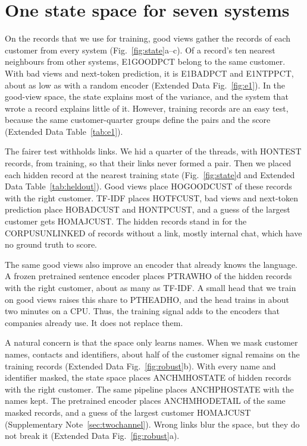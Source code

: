 \documentclass[11pt]{article}
\begin{document}
\section{One state space for seven systems}

On the records that we use for training, good views gather the records of each customer from every system (Fig.~\ref{fig:state}a--c). Of a record's ten nearest neighbours from other systems, E1GOODPCT belong to the same customer. With bad views and next-token prediction, it is E1BADPCT and E1NTPPCT, about as low as with a random encoder (Extended Data Fig.~\ref{fig:e1}). In the good-view space, the state explains most of the variance, and the system that wrote a record explains little of it. However, training records are an easy test, because the same customer-quarter groups define the pairs and the score (Extended Data Table~\ref{tab:e1}).

The fairer test withholds links. We hid a quarter of the threads, with HONTEST records, from training, so that their links never formed a pair. Then we placed each hidden record at the nearest training state (Fig.~\ref{fig:state}d and Extended Data Table~\ref{tab:heldout}). Good views place HOGOODCUST of these records with the right customer. TF-IDF places HOTFCUST, bad views and next-token prediction place HOBADCUST and HONTPCUST, and a guess of the largest customer gets HOMAJCUST. The hidden records stand in for the CORPUSUNLINKED of records without a link, mostly internal chat, which have no ground truth to score.

The same good views also improve an encoder that already knows the language. A frozen pretrained sentence encoder places PTRAWHO of the hidden records with the right customer, about as many as TF-IDF. A small head that we train on good views raises this share to PTHEADHO, and the head trains in about two minutes on a CPU. Thus, the training signal adds to the encoders that companies already use. It does not replace them.

A natural concern is that the space only learns names. When we mask customer names, contacts and identifiers, about half of the customer signal remains on the training records (Extended Data Fig.~\ref{fig:robust}b). With every name and identifier masked, the state space places ANCHMHOSTATE of hidden records with the right customer. The same pipeline places ANCHPHOSTATE with the names kept. The pretrained encoder places ANCHMHODETAIL of the same masked records, and a guess of the largest customer HOMAJCUST (Supplementary Note~\ref{sec:twochannel}). Wrong links blur the space, but they do not break it (Extended Data Fig.~\ref{fig:robust}a).
\end{document}
